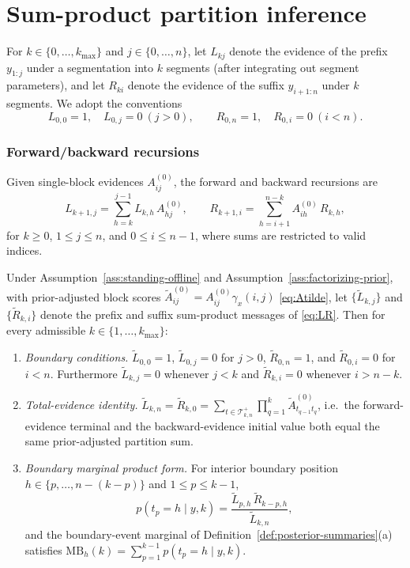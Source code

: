 \chapter{Sum-product partition inference}
\label{ch:sumproduct}
\label{app:marginals}

\label{sec:dp}

For $k\in\{0,\dots,k_{\max}\}$ and $j\in\{0,\dots,n\}$, let $L_{k j}$ denote the evidence of
the prefix $y_{1:j}$ under a segmentation into $k$ segments (after integrating out segment
parameters), and let $R_{k i}$ denote the evidence of the suffix $y_{i+1:n}$ under $k$
segments. We adopt the conventions
\[
L_{0,0}=1,\quad L_{0,j}=0\ (j>0),\qquad
R_{0,n}=1,\quad R_{0,i}=0\ (i<n).
\]

\subsection{Forward/backward recursions}
Given single-block evidences $A^{(0)}_{ij}$, the forward and backward recursions are
\begin{equation}
L_{k+1,j}
 = \sum_{h=k}^{j-1} L_{k,h}\,A^{(0)}_{h j},\qquad
R_{k+1,i}
 = \sum_{h=i+1}^{n-k} A^{(0)}_{i h}\,R_{k,h},
\label{eq:LR}
\end{equation}
for $k\ge0$, $1\le j\le n$, and $0\le i\le n-1$, where sums are restricted to valid indices.

\begin{proposition}
\label{prop:fb-duality}
Under Assumption~\ref{ass:standing-offline} and Assumption~\ref{ass:factorizing-prior}, with
prior-adjusted block scores $\widetilde A^{(0)}_{ij}=A^{(0)}_{ij}\gamma_x(i,j)$
\eqref{eq:Atilde}, let $\{\widetilde L_{k,j}\}$ and $\{\widetilde R_{k,i}\}$ denote the prefix and
suffix sum-product messages of \eqref{eq:LR}. Then for every admissible
$k\in\{1,\dots,k_{\max}\}$:
\begin{enumerate}[label=\textnormal{(\roman*)}]
\item \emph{Boundary conditions.}
$\widetilde L_{0,0}=1$, $\widetilde L_{0,j}=0$ for $j>0$, $\widetilde R_{0,n}=1$, and
$\widetilde R_{0,i}=0$ for $i<n$. Furthermore $\widetilde L_{k,j}=0$ whenever $j<k$ and
$\widetilde R_{k,i}=0$ whenever $i>n-k$.
\item \emph{Total-evidence identity.}
$\widetilde L_{k,n}=\widetilde R_{k,0}=\sum_{t\in\mathcal T_{k,n}^{+}}\prod_{q=1}^k \widetilde A^{(0)}_{t_{q-1}t_q}$,
i.e.\ the forward-evidence terminal and the backward-evidence initial value both equal the same
prior-adjusted partition sum.
\item \emph{Boundary marginal product form.}
For interior boundary position $h\in\{p,\dots,n-(k-p)\}$ and $1\le p\le k-1$,
\[
p(t_p=h\mid y,k)=\frac{\widetilde L_{p,h}\,\widetilde R_{k-p,h}}{\widetilde L_{k,n}},
\]
and the boundary-event marginal of Definition~\ref{def:posterior-summaries}(a) satisfies
$\mathrm{MB}_h(k)=\sum_{p=1}^{k-1}p(t_p=h\mid y,k)$.
\end{enumerate}
\end{proposition}

